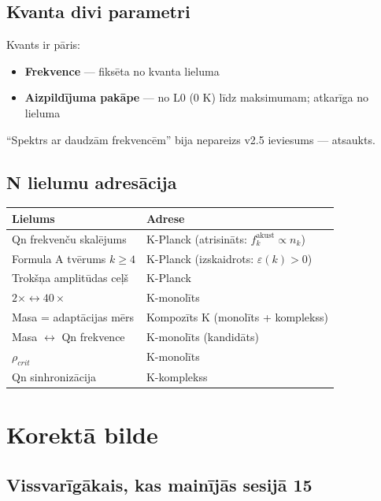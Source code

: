 \documentclass[12pt,a4paper]{article}
\begin{document}
\subsection*{Kvanta divi parametri}

Kvants ir pāris:
\begin{itemize}
    \item \textbf{Frekvence} — fiksēta no kvanta lieluma
    \item \textbf{Aizpildījuma pakāpe} — no L0 (0 K) līdz maksimumam; atkarīga no lieluma
\end{itemize}

``Spektrs ar daudzām frekvencēm'' bija nepareizs v2.5 ieviesums — atsaukts.

\subsection*{N lielumu adresācija}

\begin{table}[h]
\centering
\begin{tabular}{|l|l|}
\hline
\textbf{Lielums} & \textbf{Adrese} \\
\hline
Qn frekvenču skalējums & K-Planck (atrisināts: $f_k^{\text{akust}} \propto n_k$) \\
Formula A tvērums $k\geq 4$ & K-Planck (izskaidrots: $\varepsilon(k) > 0$) \\
Trokšņa amplitūdas ceļš & K-Planck \\
$2\times \leftrightarrow 40\times$ & K-monolīts \\
Masa = adaptācijas mērs & Kompozīts K (monolīts + komplekss) \\
Masa $\leftrightarrow$ Qn frekvence & K-monolīts (kandidāts) \\
$\rho_{crit}$ & K-monolīts \\
Qn sinhronizācija & K-komplekss \\
\hline
\end{tabular}
\end{table}

\newpage

\section{Korektā bilde}
\label{sec:korekta}

\subsection*{Vissvarīgākais, kas mainījās sesijā 15}
\end{document}

